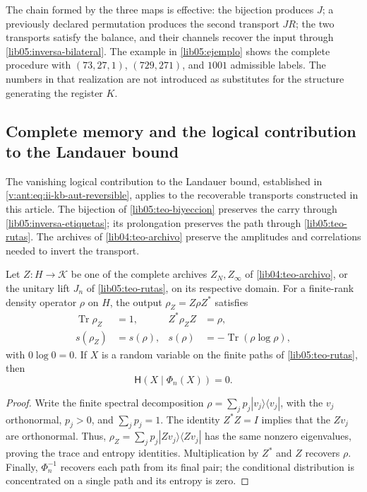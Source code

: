 The chain formed by the three maps is effective: the bijection
produces \(J\); a previously declared permutation produces the
second transport \(JR\); the two transports satisfy the
balance, and their channels recover the input through
\eqref{lib05:inversa-bilateral}. The example in
\cref{lib05:ejemplo} shows the complete procedure with
\((73,27,1)\), \((729,271)\), and \(1001\) admissible labels.
The numbers in that realization are not introduced as substitutes for
the structure generating the register \(K\).

\subsection{Complete memory and the logical contribution to the Landauer bound}
\label{landauer:puente-archivo}

The vanishing logical contribution to the Landauer bound, established in
\eqref{v:ant:eq:ii-kb-aut-reversible}, applies to the recoverable
transports constructed in this article. The bijection of
\cref{lib05:teo-biyeccion} preserves the carry through
\eqref{lib05:inversa-etiquetas}; its prolongation preserves the path
through \cref{lib05:teo-rutas}. The archives of
\cref{lib04:teo-archivo} preserve the amplitudes and correlations
needed to invert the transport.

\begin{corollary}
\label{landauer:cor-archivo}
Let \(Z:H\to\mathcal K\) be one of the complete archives
\(Z_N,Z_\infty\) of \cref{lib04:teo-archivo}, or the unitary
lift \(J_n\) of \cref{lib05:teo-rutas}, on its respective domain.
For a finite-rank density operator \(\rho\) on \(H\),
the output \(\rho_Z=Z\rho Z^*\) satisfies
\begin{align}
 \operatorname{Tr}\rho_Z&=1,& Z^*\rho_ZZ&=\rho,\\
 s(\rho_Z)&=s(\rho),&
 s(\rho)&=-\operatorname{Tr}(\rho\log\rho),
 \label{landauer:espectro}
\end{align}
with \(0\log0=0\). If \(X\) is a random variable on the finite
paths of \cref{lib05:teo-rutas}, then
\begin{equation}
 \mathsf H(X\mid\Phi_n(X))=0.
 \label{landauer:recuperacion-ruta}
\end{equation}
\end{corollary}
\begin{proof}
Write the finite spectral decomposition
\(\rho=\sum_jp_j|v_j\rangle\langle v_j|\), with the \(v_j\)
orthonormal, \(p_j>0\), and \(\sum_jp_j=1\). The identity
\(Z^*Z=I\) implies that the \(Zv_j\) are orthonormal. Thus,
\(\rho_Z=\sum_jp_j|Zv_j\rangle\langle Zv_j|\) has the same
nonzero eigenvalues, proving the trace and entropy identities.
Multiplication by \(Z^*\) and \(Z\) recovers \(\rho\). Finally,
\(\Phi_n^{-1}\) recovers each path from its final pair; the
conditional distribution is concentrated on a single path and its
entropy is zero.
\end{proof}

